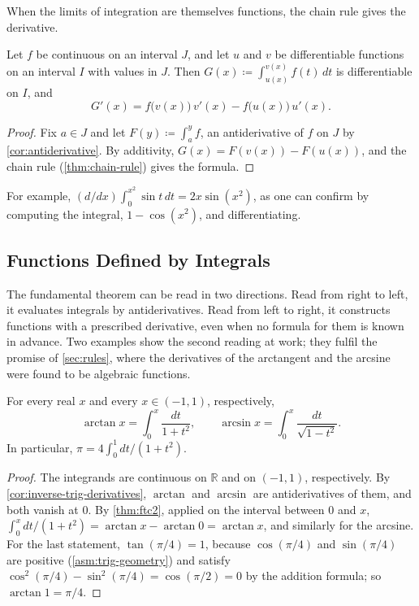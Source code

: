 When the limits of integration are themselves functions, the chain rule gives the derivative.

\begin{corollary}
\label{cor:variable-limits}
Let $f$ be continuous on an interval $J$, and let $u$ and $v$ be differentiable functions on an interval $I$ with values in $J$. Then $G(x)\coloneqq\int_{u(x)}^{v(x)}f(t)\,dt$ is differentiable on $I$, and
\[
G'(x)=f\bigl(v(x)\bigr)\,v'(x)-f\bigl(u(x)\bigr)\,u'(x).
\]
\end{corollary}

\begin{proof}
Fix $a\in J$ and let $F(y)\coloneqq\int_a^yf$, an antiderivative of $f$ on $J$ by \cref{cor:antiderivative}. By additivity, $G(x)=F(v(x))-F(u(x))$, and the chain rule (\cref{thm:chain-rule}) gives the formula.
\end{proof}

For example, $(d/dx)\int_0^{x^2}\sin t\,dt=2x\sin(x^2)$, as one can confirm by computing the integral, $1-\cos(x^2)$, and differentiating.

\subsection{Functions Defined by Integrals}

The fundamental theorem can be read in two directions. Read from right to left, it evaluates integrals by antiderivatives. Read from left to right, it constructs functions with a prescribed derivative, even when no formula for them is known in advance. Two examples show the second reading at work; they fulfil the promise of \cref{sec:rules}, where the derivatives of the arctangent and the arcsine were found to be algebraic functions.

\begin{proposition}
\label{prop:arctan-integral}
For every real $x$ and every $x\in(-1,1)$, respectively,
\[
\arctan x=\int_0^x\frac{dt}{1+t^2},\qquad\arcsin x=\int_0^x\frac{dt}{\sqrt{1-t^2}} .
\]
In particular, $\pi=4\int_0^1dt/(1+t^2)$.
\end{proposition}

\begin{proof}
The integrands are continuous on $\mathbb R$ and on $(-1,1)$, respectively. By \cref{cor:inverse-trig-derivatives}, $\arctan$ and $\arcsin$ are antiderivatives of them, and both vanish at $0$. By \cref{thm:ftc2}, applied on the interval between $0$ and $x$, $\int_0^x dt/(1+t^2)=\arctan x-\arctan0=\arctan x$, and similarly for the arcsine. For the last statement, $\tan(\pi/4)=1$, because $\cos(\pi/4)$ and $\sin(\pi/4)$ are positive (\cref{asm:trig-geometry}) and satisfy $\cos^2(\pi/4)-\sin^2(\pi/4)=\cos(\pi/2)=0$ by the addition formula; so $\arctan1=\pi/4$.
\end{proof}

